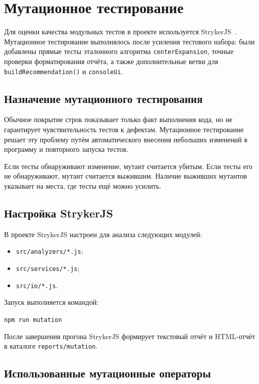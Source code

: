 \chapter{Мутационное тестирование} \label{ch6}

Для оценки качества модульных тестов в проекте используется StrykerJS~\cite{stryker-docs}.
Мутационное тестирование выполнялось после усиления тестового набора: были добавлены прямые тесты эталонного алгоритма \texttt{centerExpansion}, точные проверки форматирования отчёта, а также дополнительные ветви для \texttt{buildRecommendation()} и \texttt{consoleUi}.

\section{Назначение мутационного тестирования} \label{ch6:sec1}

Обычное покрытие строк показывает только факт выполнения кода, но не гарантирует чувствительность тестов к дефектам.
Мутационное тестирование решает эту проблему путём автоматического внесения небольших изменений в программу и повторного запуска тестов.

Если тесты обнаруживают изменение, мутант считается убитым.
Если тесты его не обнаруживают, мутант считается выжившим.
Наличие выживших мутантов указывает на места, где тесты ещё можно усилить.

\section{Настройка StrykerJS} \label{ch6:sec2}

В проекте StrykerJS настроен для анализа следующих модулей:
\begin{itemize}
    \item \texttt{src/analyzers/*.js};
    \item \texttt{src/services/*.js};
    \item \texttt{src/io/*.js}.
\end{itemize}

Запуск выполняется командой:
\begin{center}
\texttt{npm run mutation}
\end{center}

После завершения прогона StrykerJS формирует текстовый отчёт и HTML-отчёт в каталоге \texttt{reports/mutation}.

\section{Использованные мутационные операторы} \label{ch6:sec3}

